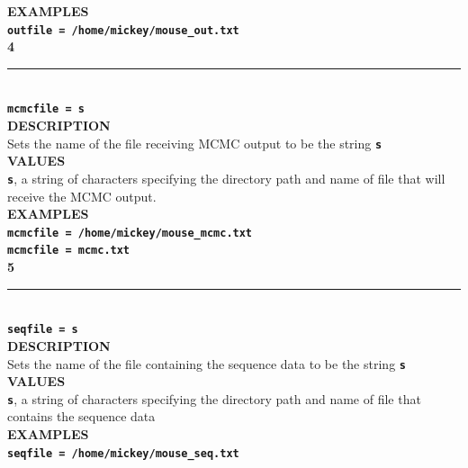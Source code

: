 \documentclass{book}
\numberwithin{equation}{section} \renewcommand{\baselinestretch}{0.55}
\begin{document}
\textbf{EXAMPLES} \vspace{5pt}\\
\textbf{\texttt{outfile = /home/mickey/mouse\_out.txt}} \vspace{10pt}\\
\textbf{{\large 4}} \\
\noindent\rule{\textwidth}{0.8pt} \\
\textbf{{\Large \texttt{mcmcfile = s}}} \vspace{5pt} \\
\textbf{DESCRIPTION} \vspace{5pt}\\
Sets the name of the file receiving MCMC output to be the string \textbf{\texttt{s}} \vspace{5pt}\\
\textbf{VALUES} \vspace{5pt}\\
\textbf{\texttt{s}}, a string of characters specifying the directory path and name of file that will receive the MCMC output. \vspace{5pt}\\
\textbf{EXAMPLES} \vspace{5pt}\\
\textbf{\texttt{mcmcfile = /home/mickey/mouse\_mcmc.txt}} \vspace{5pt}\\
\textbf{\texttt{mcmcfile = mcmc.txt}} \vspace{10pt}\\
\textbf{{\large 5}} \\
\noindent\rule{\textwidth}{0.8pt} \\
\textbf{{\Large \texttt{seqfile = s}}} \vspace{5pt} \\
\textbf{DESCRIPTION} \vspace{5pt}\\
Sets the name of the file containing the sequence data to be the string \textbf{\texttt{s}} \vspace{5pt}\\
\textbf{VALUES} \vspace{5pt}\\
\textbf{\texttt{s}}, a string of characters specifying the directory path and name of file that contains the sequence data \vspace{5pt}\\
\textbf{EXAMPLES} \vspace{5pt}\\
\textbf{\texttt{seqfile = /home/mickey/mouse\_seq.txt}} \vspace{5pt}\\
\end{document}
